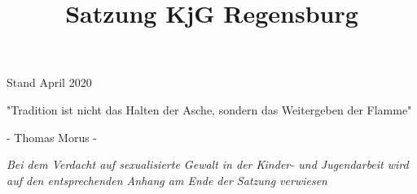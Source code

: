 \documentclass[12pt]{report}
\title{Satzung KjG Regensburg}
\author{}
\begin{document}
  \maketitle
  \begin{center}
    \pagestyle{empty}
    \BgThispage
    \vspace*{\fill}
    \begin{Huge}
      { \color{kjgtuerkis}  Stand April 2020}
    \end{Huge}
    \vspace*{\fill}
    \newpage
    \pagestyle{empty}
    \vspace*{\fill}
    \begin{Huge}
     "Tradition ist nicht das Halten der Asche, sondern das Weitergeben der Flamme"
    \end{Huge}
    \newline
    \begin{large}
      - Thomas Morus -
    \end{large}
    \vspace*{\fill}
  \end{center}

  \tableofcontents
   \it{ Bei dem Verdacht auf sexualisierte Gewalt in der Kinder- und Jugendarbeit wird auf den entsprechenden Anhang am Ende der Satzung verwiesen}
  \newpage  
  \setcounter{page}{1}
\end{document}
